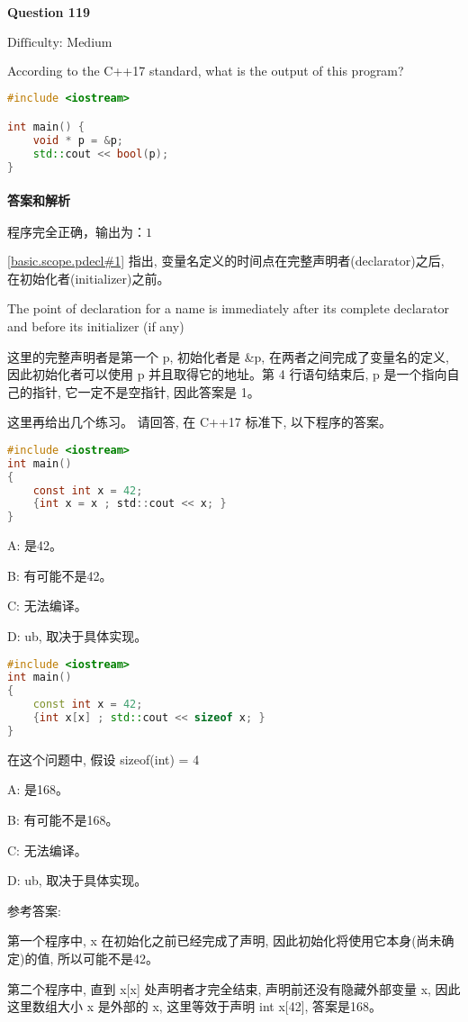 \documentclass{article}
\begin{document}
	\paragraph*{Question 119}\noindent $\boxed{\text{Difficulty: Medium}} $
	
	According to the C++17 standard, what is the output of this program? 
	
	\begin{lstlisting}[language=C++]    
#include <iostream>

int main() {
	void * p = &p;
	std::cout << bool(p);
}
	\end{lstlisting}
	
	\paragraph*{答案和解析} $\boxed{\text{程序完全正确，输出为：1}} $
	
	\href{https://timsong-cpp.github.io/cppwp/n4659/basic.scope.pdecl#1}{[basic.scope.pdecl\#1]} 指出, 变量名定义的时间点在完整声明者(declarator)之后, 在初始化者(initializer)之前。
	\begin{lightgrayleftbar}
		The point of declaration for a name is immediately after its complete declarator and before its initializer (if any)
	\end{lightgrayleftbar}
	这里的完整声明者是第一个 p, 初始化者是 \&p, 在两者之间完成了变量名的定义, 因此初始化者可以使用 p 并且取得它的地址。第 4 行语句结束后, p 是一个指向自己的指针, 它一定不是空指针, 因此答案是 1。
	
	这里再给出几个练习。
	请回答, 在 C++17 标准下, 以下程序的答案。
	
	\begin{lstlisting}[language=C]    
#include <iostream>
int main()
{
	const int x = 42;
	{int x = x ; std::cout << x; }
}
	\end{lstlisting}

	A: 是42。
	
	B: 有可能不是42。
	
	C: 无法编译。
	
	D: ub, 取决于具体实现。
	
	\begin{lstlisting}[language=C++]    
#include <iostream>
int main()
{
	const int x = 42;
	{int x[x] ; std::cout << sizeof x; }
}
	\end{lstlisting}

	在这个问题中, 假设 sizeof(int) = 4
	
	A: 是168。
	
	B: 有可能不是168。
	
	C: 无法编译。
	
	D: ub, 取决于具体实现。
	
	参考答案: 
	
	第一个程序中, x 在初始化之前已经完成了声明, 因此初始化将使用它本身(尚未确定)的值, 所以可能不是42。
	
	第二个程序中, 直到 x[x] 处声明者才完全结束, 声明前还没有隐藏外部变量 x, 因此这里数组大小 x 是外部的 x, 这里等效于声明 int x[42], 答案是168。
	
\end{document}
